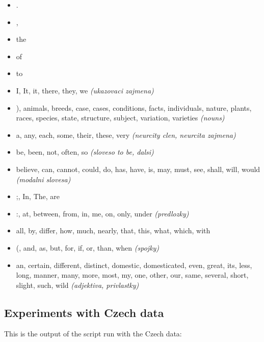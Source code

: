 \documentclass[12pt,a4paper]{article}
\begin{document}
\begin{itemize}
  \item .
  \item ,
  \item the
  \item of
  \item to
  \item I, It, it, there, they, we \textit{(ukazovaci zajmena)}
  \item ), animals, breeds, case, cases, conditions, facts, individuals, nature, plants, races, species, state, structure, subject, variation, varieties \textit{(nouns)}
  \item a, any, each, some, their, these, very \textit{(neurcity clen, neurcita zajmena)}
  \item be, been, not, often, so \textit{(sloveso to be, dalsi)}
  \item believe, can, cannot, could, do, has, have, is, may, must, see, shall, will, would \textit{(modalni slovesa)}
  \item ;, In, The, are
  \item :, at, between, from, in, me, on, only, under \textit{(predlozky)}
  \item all, by, differ, how, much, nearly, that, this, what, which, with
  \item (, and, as, but, for, if, or, than, when \textit{(spojky)}
  \item an, certain, different, distinct, domestic, domesticated, even, great, its, less, long, manner, many, more, most, my, one, other, our, same, several, short, slight, such, wild \textit{(adjektiva, privlastky)}
\end{itemize}

\subsection{Experiments with Czech data}

This is the output of the script run with the Czech data:
\end{document}
